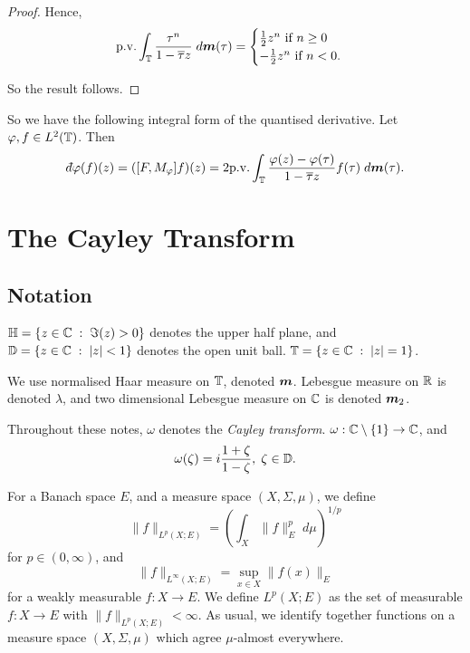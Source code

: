 \begin{proof}
    Hence, 
    \begin{equation*}
        \mathrm{p.v.}\int_{\mathbb{T}} \frac{\tau^n}{1-\overline{\tau}z}\;d\boldsymbol{m}(\tau) = \begin{cases}
            \frac{1}{2}z^n\text{ if }n \geq 0\\
            -\frac{1}{2}z^n\text{ if }n < 0.
        \end{cases}
    \end{equation*}
    
    So the result follows.
    
\end{proof}

So we have the following integral form of the quantised derivative. Let $\varphi,f \in L^2(\mathbb{T})$.
Then
\begin{equation*}
    \qd\varphi(f)(z) = ([F,M_\varphi]f)(z) = 2\pvint_\Circ \frac{\varphi(z)-\varphi(\tau)}{1-\overline{\tau}z}f(\tau)\;d\ha(\tau).
\end{equation*}

\section{The Cayley Transform}

\subsection{Notation}
$\mathbb{H} = \{z \in \mathbb{C}\;:\;\Im(z) > 0\}$ denotes the upper half plane,
and $\mathbb{D} = \{z\in \mathbb{C}\;:\; |z| < 1\}$ denotes the open unit ball.
$\mathbb{T} = \{z \in \mathbb{C}\;:\; |z| = 1\}$.

We use normalised Haar measure on $\mathbb{T}$, denoted $\boldsymbol{m}$. Lebesgue
measure on $\mathbb{R}$ is denoted $\lambda$, and two dimensional Lebesgue measure on
$\mathbb{C}$ is denoted $\boldsymbol{m}_2$.

Throughout these notes, $\omega$ denotes the \emph{Cayley transform}.
$\omega:\mathbb{C}\setminus\{1\}\rightarrow \mathbb{C}$, and 
\begin{equation*}
    \omega(\zeta) = i\frac{1+\zeta}{1-\zeta},\;\zeta \in \mathbb{D}.
\end{equation*}

For a Banach space $E$, and a measure space $(X,\Sigma,\mu)$, we define
\begin{equation*}
    \|f\|_{L^p(X;E)} = \left(\int_X \|f\|_E^p \;d\mu\right)^{1/p}
\end{equation*}
for $p \in (0,\infty)$, and
\begin{equation*}
    \|f\|_{L^\infty(X;E)} = \sup_{x \in X} \|f(x)\|_E
\end{equation*}
for a weakly measurable $f:X\rightarrow E$. We define $L^p(X;E)$ as the set
of measurable $f:X\rightarrow E$ with $\|f\|_{L^p(X;E)} < \infty$. As usual, 
we identify together functions on a measure space $(X,\Sigma,\mu)$ 
which agree $\mu$-almost everywhere.

